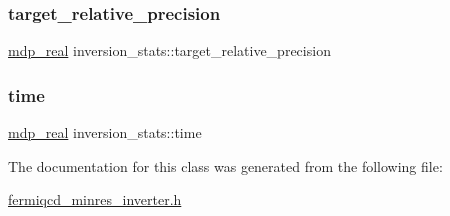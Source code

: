 \mbox{\label{classinversion__stats_a57f0e5274f6057d41a9e386d2d3d213e}} 
\subsubsection{\texorpdfstring{target\+\_\+relative\+\_\+precision}{target\_relative\_precision}}
{\footnotesize\ttfamily \hyperlink{mdp__global__vars_8h_a69d96b74c791e0bbdb888b3913a69450}{mdp\+\_\+real} inversion\+\_\+stats\+::target\+\_\+relative\+\_\+precision}

\mbox{\label{classinversion__stats_a648a0c2aae15866e7331d0cd4d0736ff}} 
\subsubsection{\texorpdfstring{time}{time}}
{\footnotesize\ttfamily \hyperlink{mdp__global__vars_8h_a69d96b74c791e0bbdb888b3913a69450}{mdp\+\_\+real} inversion\+\_\+stats\+::time}



The documentation for this class was generated from the following file\+:\begin{DoxyCompactItemize}
\item 
\hyperlink{fermiqcd__minres__inverter_8h}{fermiqcd\+\_\+minres\+\_\+inverter.\+h}\end{DoxyCompactItemize}
